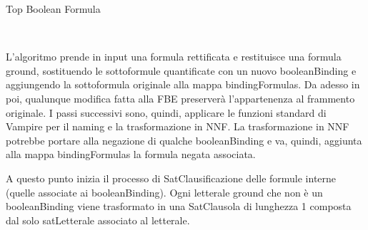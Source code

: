 \documentclass[./main.tex]{subfiles}
\begin{document}
\begin{algorithm}[H] \label{alg:topBooleanFormula}
    \caption{Top Boolean Formula}
    \\
\end{algorithm}

L'algoritmo prende in input una formula rettificata e restituisce una formula ground, sostituendo le sottoformule quantificate con 
un nuovo booleanBinding e aggiungendo la sottoformula originale alla mappa bindingFormulas.
Da adesso in poi, qualunque modifica fatta alla FBE preserverà l'appartenenza al frammento originale.
I passi successivi sono, quindi, applicare le funzioni standard di Vampire per il naming e la trasformazione in NNF.
La trasformazione in NNF potrebbe portare alla negazione di qualche booleanBinding
e va, quindi, aggiunta alla mappa bindingFormulas la formula negata associata.


A questo punto inizia il processo di SatClausificazione delle formule interne (quelle associate ai booleanBinding).
Ogni letterale ground che non è un booleanBinding viene trasformato in una 
SatClausola di lunghezza 1 composta dal solo satLetterale associato al letterale.

\end{document}
